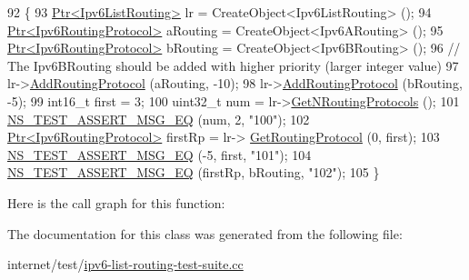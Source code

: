 \begin{DoxyCode}
92 \{
93   \hyperlink{classns3_1_1Ptr}{Ptr<Ipv6ListRouting>} lr = CreateObject<Ipv6ListRouting> ();
94   \hyperlink{classns3_1_1Ptr}{Ptr<Ipv6RoutingProtocol>} aRouting = CreateObject<Ipv6ARouting> ();
95   \hyperlink{classns3_1_1Ptr}{Ptr<Ipv6RoutingProtocol>} bRouting = CreateObject<Ipv6BRouting> ();
96   \textcolor{comment}{// The Ipv6BRouting should be added with higher priority (larger integer value)}
97   lr->\hyperlink{classns3_1_1Ipv6ListRouting_af2f9faf061ec907349d7287475fe73bc}{AddRoutingProtocol} (aRouting, -10);
98   lr->\hyperlink{classns3_1_1Ipv6ListRouting_af2f9faf061ec907349d7287475fe73bc}{AddRoutingProtocol} (bRouting, -5);
99   int16\_t first = 3;
100   uint32\_t num = lr->\hyperlink{classns3_1_1Ipv6ListRouting_a7aa04efd7a6833dddcebe061bcbb0e78}{GetNRoutingProtocols} ();
101   \hyperlink{group__testing_ga2a9d78cffb3db8e867c35fff0b698cf5}{NS\_TEST\_ASSERT\_MSG\_EQ} (num, 2, \textcolor{stringliteral}{"100"});
102   \hyperlink{classns3_1_1Ptr}{Ptr<Ipv6RoutingProtocol>} firstRp = lr->
      \hyperlink{classns3_1_1Ipv6ListRouting_ac57acbccab04b57ffb62a8bd9d40d506}{GetRoutingProtocol} (0, first);
103   \hyperlink{group__testing_ga2a9d78cffb3db8e867c35fff0b698cf5}{NS\_TEST\_ASSERT\_MSG\_EQ} (-5, first, \textcolor{stringliteral}{"101"});
104   \hyperlink{group__testing_ga2a9d78cffb3db8e867c35fff0b698cf5}{NS\_TEST\_ASSERT\_MSG\_EQ} (firstRp, bRouting, \textcolor{stringliteral}{"102"});
105 \}
\end{DoxyCode}


Here is the call graph for this function\+:




The documentation for this class was generated from the following file\+:\begin{DoxyCompactItemize}
\item 
internet/test/\hyperlink{ipv6-list-routing-test-suite_8cc}{ipv6-\/list-\/routing-\/test-\/suite.\+cc}\end{DoxyCompactItemize}
